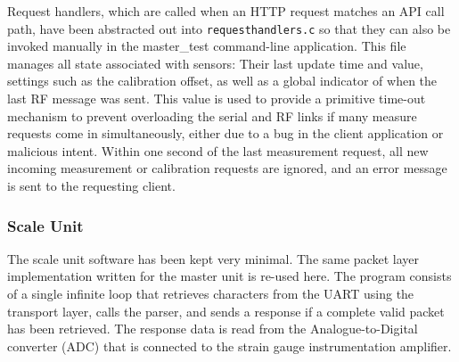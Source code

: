 Request handlers, which are called when an HTTP request matches an API call path, have been abstracted out into \texttt{requesthandlers.c} so that they can also be invoked manually in the master\_test command-line application. This file manages all state associated with sensors: Their last update time and value, settings such as the calibration offset, as well as a global indicator of when the last RF message was sent. This value is used to provide a primitive time-out mechanism to prevent overloading the serial and RF links if many measure requests come in simultaneously, either due to a bug in the client application or malicious intent. Within one second of the last measurement request, all new incoming measurement or calibration requests are ignored, and an error message is sent to the requesting client.

\subsubsection{Scale Unit}
The scale unit software has been kept very minimal. The same packet layer implementation written for the master unit is re-used here. The program consists of a single infinite loop that retrieves characters from the UART using the transport layer, calls the parser, and sends a response if a complete valid packet has been retrieved. The response data is read from the Analogue-to-Digital converter (ADC) that is connected to the strain gauge instrumentation amplifier.
